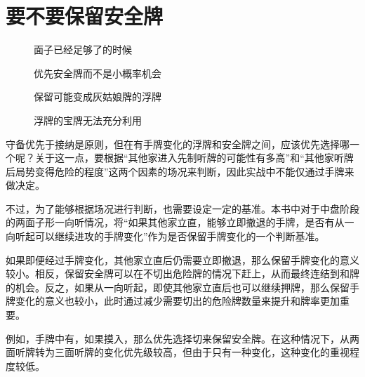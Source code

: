 \section{要不要保留安全牌}
\begin{figure}[h]
    \caption{面子已经足够了的时候}
    \label{lec8:pai1-2}
    \par\bigskip
\end{figure}
\begin{figure}[h]
    \caption{优先安全牌而不是小概率机会}
    \label{lec8:pai3}
\end{figure}
\begin{figure}[h]
    \caption{保留可能变成灰姑娘牌的浮牌}
    \label{lec8:pai4}
\end{figure}
\begin{figure}[h]
    \caption{浮牌的宝牌无法充分利用}
    \label{lec8:pai5}
\end{figure}

守备优先于接纳是原则，但在有手牌变化的浮牌和安全牌之间，应该优先选择哪一个呢？关于这一点，要根据“其他家进入先制听牌的可能性有多高”和“其他家听牌后局势变得危险的程度”这两个因素的场况来判断，因此实战中不能仅通过手牌来做决定。

不过，为了能够根据场况进行判断，也需要设定一定的基准。本书中对于中盘阶段的两面子形一向听情况，将“如果其他家立直，能够立即撤退的手牌，是否有从一向听起可以继续进攻的手牌变化”作为是否保留手牌变化的一个判断基准。

如果即便经过手牌变化，其他家立直后仍需要立即撤退，那么保留手牌变化的意义较小。相反，保留安全牌可以在不切出危险牌的情况下赶上，从而最终连结到和牌的机会。反之，如果从一向听起，即使其他家立直后也可以继续押牌，那么保留手牌变化的意义也较小，此时通过减少需要切出的危险牌数量来提升和牌率更加重要。

例如，手牌中有，如果摸入，那么优先选择切来保留安全牌。在这种情况下，从两面听牌转为三面听牌的变化优先级较高，但由于只有一种变化，这种变化的重视程度较低。